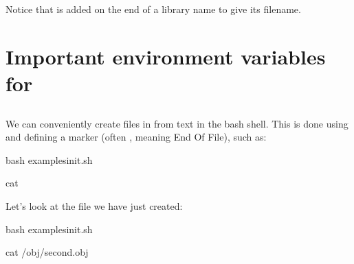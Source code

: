 \documentclass[letterpaper,10pt,english]{sphinxmanual}
\begin{document}
Notice that  is added on the end of a library name to give its filename.


\section{Important environment variables for }
\label{\detokenize{Appendix1:Important-environment-variables-for-librat}}

\subsection{}
\label{\detokenize{Appendix1:cat-<<EOF->-output-...-EOF}}
We can conveniently create files in  from text in the bash shell. This is done using  and defining a marker (often , meaning End Of File), such as:

{
\begin{sphinxVerbatim}[commandchars=\\\{\}]
\llap{\color{nbsphinxin}[21]:\,\hspace{\fboxrule}\hspace{\fboxsep}}\PYGZpc{}\PYGZpc{}bash
 examples\PYGZus{}init.sh


cat 
\end{sphinxVerbatim}
}

Let’s look at the file we have just created:

{
\begin{sphinxVerbatim}[commandchars=\\\{\}]
\llap{\color{nbsphinxin}[22]:\,\hspace{\fboxrule}\hspace{\fboxsep}}\PYGZpc{}\PYGZpc{}bash
 examples\PYGZus{}init.sh

cat /obj/second.obj
\end{sphinxVerbatim}
}
\end{document}
